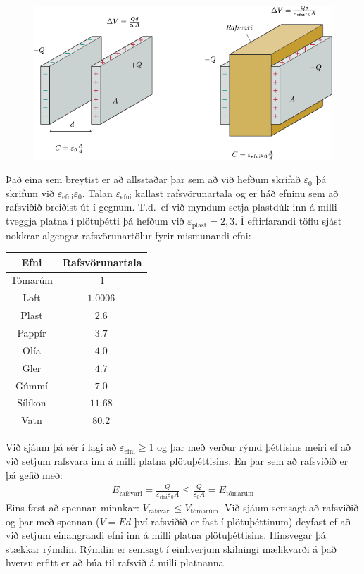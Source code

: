 \ifdefined \wholebook \else\documentclass[oneside]{book}\usepackage{EdlBook}\graphicspath{{figures/}}
\begin{document}
\begin{figure}[ht]
    \centering
    \includegraphics{figures/rafsvari.pdf}
\end{figure}

Það eina sem breytist er að allsstaðar þar sem að við hefðum skrifað $\varepsilon_0$ þá skrifum við $\varepsilon_{\text{efni}} \varepsilon_0$. Talan $\varepsilon_{\text{efni}}$ kallast rafsvörunartala og er háð efninu sem að rafsviðið breiðist út í gegnum. T.d.~ef við myndum setja plastdúk inn á milli tveggja platna í plötuþétti þá hefðum við $\varepsilon_{\text{plast}} = 2,3$. Í eftirfarandi töflu sjást nokkrar algengar rafsvörunartölur fyrir mismunandi efni:

\begin{table}[ht]
    \centering
    \begin{tabular}{|c|c|}
    \hline
        \textbf{Efni} & \textbf{Rafsvörunartala} \\ \hline \hline
        Tómarúm & $1$ \\ \hline
        Loft & $\SI{1.0006}{}$ \\ \hline
        Plast & $\SI{2.6}{}$ \\ \hline
        Pappír & $\SI{3.7}{}$ \\ \hline
        Olía & $\SI{4.0}{}$ \\ \hline
        Gler & $\SI{4.7}{}$ \\ \hline
        Gúmmí & $\SI{7.0}{}$ \\ \hline
        Sílíkon & $\SI{11.68}{}$ \\ \hline
        Vatn & $\SI{80.2}{}$ \\ \hline
    \end{tabular}
\end{table}
Við sjáum þá sér í lagi að $\varepsilon_{\text{efni}} \geq 1$ og þar með verður rýmd þéttisins meiri ef að við setjum rafsvara inn á milli platna plötuþéttisins. En þar sem að rafsviðið er þá gefið með:
\begin{align*}
    E_{\text{rafsvari}} = \frac{Q}{ \varepsilon_{\text{efni}} \varepsilon_0 A} \leq \frac{Q}{ \varepsilon_0 A} = E_{\text{tómarúm}}
\end{align*}
Eins fæst að spennan minnkar: $V_{\text{rafsvari}} \leq V_{\text{tómarúm}}$. Við sjáum semsagt að rafsviðið og þar með spennan ($V = Ed$ því rafsviðið er fast í plötuþéttinum) deyfast ef að við setjum einangrandi efni inn á milli platna plötuþéttisins. Hinsvegar þá stækkar rýmdin. Rýmdin er semsagt í einhverjum skilningi mælikvarði á það hversu erfitt er að búa til rafsvið á milli platnanna.
\end{document}
